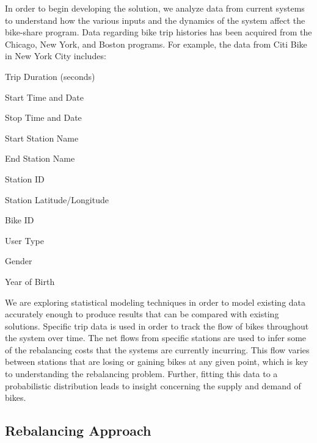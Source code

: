 \documentclass{sig-alternate}
\begin{document}
In order to begin developing the solution, we analyze data from current systems to understand how the various inputs and the dynamics of the system affect the bike-share program. Data regarding bike trip histories has been acquired from the Chicago, New York, and Boston programs. For example, the data from Citi Bike in New York City includes:

\begin{itemize*}
\item Trip Duration (seconds)
\item Start Time and Date
\item Stop Time and Date
\item Start Station Name
\item End Station Name
\item Station ID
\item Station Latitude/Longitude
\item Bike ID
\item User Type
\item Gender  
\item Year of Birth
\end{itemize*}

We are exploring statistical modeling techniques in order to model existing data accurately enough to produce results that can be compared with existing solutions. Specific trip data is used in order to track the flow of bikes throughout the system over time. The net flows from specific stations are used to infer some of the rebalancing costs that the systems are currently incurring. This flow varies between stations that are losing or gaining bikes at any given point, which is key to understanding the rebalancing problem. Further, fitting this data to a probabilistic distribution leads to insight concerning the supply and demand of bikes.

\subsection{Rebalancing Approach}
\end{document}
